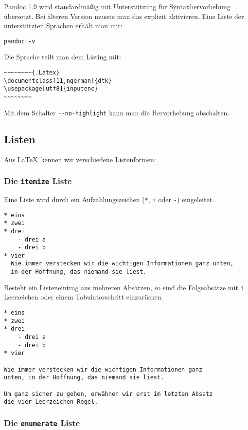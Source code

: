 \documentclass[11pt,ngerman,a4paper]{article}
\begin{document}
Pandoc 1.9 wird standardmäßig mit Unterstützung für Syntaxhervorhebung
übersetzt. Bei älteren Version musste man das explizit aktivieren. Eine
Liste der unterstützten Sprachen erhält man mit:

\begin{verbatim}
pandoc -v
\end{verbatim}

Die Sprache teilt man dem Listing mit:

\begin{verbatim}
~~~~~~~~{.Latex}
\documentclass[11,ngerman]{dtk}
\usepackage[utf8]{inputenc}
~~~~~~~~
\end{verbatim}

Mit dem Schalter \texttt{-{}-no-highlight} kann man die Hervorhebung
abschalten.

\subsection{Listen}

Aus LaTeX~kennen wir verschiedene Listenformen:

\subsubsection{Die \texttt{itemize} Liste}

Eine Liste wird durch ein Aufzählungszeichen (\texttt{*}, \texttt{+}
oder \texttt{-}) eingeleitet.

\begin{verbatim}
* eins
* zwei
* drei
    - drei a
    - drei b
* vier
  Wie immer verstecken wir die wichtigen Informationen ganz unten,
  in der Hoffnung, das niemand sie liest.
\end{verbatim}

Besteht ein Listeneintrag aus mehreren Absätzen, so sind die
Folgeabsätze mit 4 Leerzeichen oder einem Tabulatorschritt einzurücken.

\begin{verbatim}
* eins
* zwei
* drei
    - drei a
    - drei b
* vier

Wie immer verstecken wir die wichtigen Informationen ganz
unten, in der Hoffnung, das niemand sie liest.
    
Um ganz sicher zu gehen, erwähnen wir erst im letzten Absatz
die vier Leerzeichen Regel.
\end{verbatim}

\subsubsection{Die \texttt{enumerate} Liste}
\end{document}
